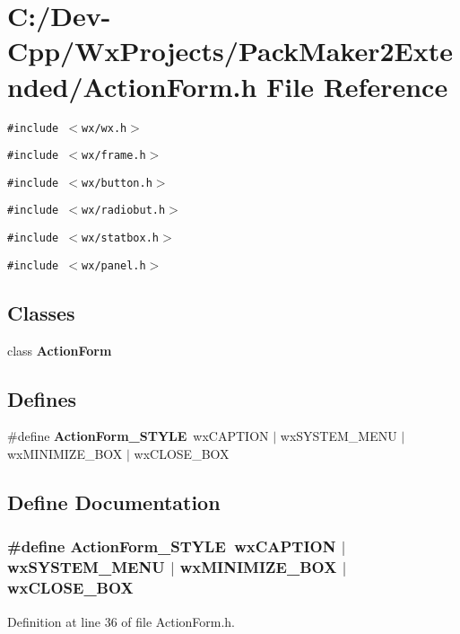 \section{C:/Dev-Cpp/Wx\-Projects/Pack\-Maker2Extended/Action\-Form.h File Reference}
\label{_action_form_8h}
{\tt \#include $<$wx/wx.h$>$}\par
{\tt \#include $<$wx/frame.h$>$}\par
{\tt \#include $<$wx/button.h$>$}\par
{\tt \#include $<$wx/radiobut.h$>$}\par
{\tt \#include $<$wx/statbox.h$>$}\par
{\tt \#include $<$wx/panel.h$>$}\par
\subsection*{Classes}
\begin{CompactItemize}
\item 
class {\bf Action\-Form}
\end{CompactItemize}
\subsection*{Defines}
\begin{CompactItemize}
\item 
\#define {\bf Action\-Form\_\-STYLE}~wx\-CAPTION $|$ wx\-SYSTEM\_\-MENU $|$ wx\-MINIMIZE\_\-BOX $|$ wx\-CLOSE\_\-BOX
\end{CompactItemize}


\subsection{Define Documentation}
\subsubsection{\setlength{\rightskip}{0pt plus 5cm}\#define Action\-Form\_\-STYLE~wx\-CAPTION $|$ wx\-SYSTEM\_\-MENU $|$ wx\-MINIMIZE\_\-BOX $|$ wx\-CLOSE\_\-BOX}\label{_action_form_8h_f9acffdfdee2c6375e1082e18753cab1}




Definition at line 36 of file Action\-Form.h.